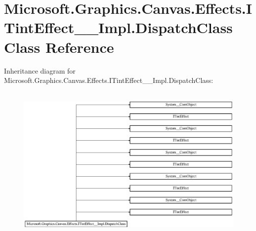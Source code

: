 \hypertarget{class_microsoft_1_1_graphics_1_1_canvas_1_1_effects_1_1_i_tint_effect_____impl_1_1_dispatch_class}{}\section{Microsoft.\+Graphics.\+Canvas.\+Effects.\+I\+Tint\+Effect\+\_\+\+\_\+\+Impl.\+Dispatch\+Class Class Reference}
\label{class_microsoft_1_1_graphics_1_1_canvas_1_1_effects_1_1_i_tint_effect_____impl_1_1_dispatch_class}
Inheritance diagram for Microsoft.\+Graphics.\+Canvas.\+Effects.\+I\+Tint\+Effect\+\_\+\+\_\+\+Impl.\+Dispatch\+Class\+:\begin{figure}[H]
\begin{center}
\leavevmode
\includegraphics[height=7.738694cm]{class_microsoft_1_1_graphics_1_1_canvas_1_1_effects_1_1_i_tint_effect_____impl_1_1_dispatch_class}
\end{center}
\end{figure}
